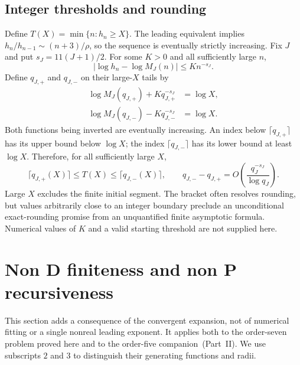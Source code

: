 \documentclass[11pt]{article}
\theoremstyle{remark}\newtheorem{remark}[theorem]{Remark}
\numberwithin{equation}{section}
\begin{document}
\subsection{Integer thresholds and rounding}
Define $T(X)=\min\{n:h_n\ge X\}$. The leading equivalent implies
$h_n/h_{n-1}\sim(n+3)/\rho$, so the sequence is eventually
strictly increasing. Fix $J$ and put $s_J=11(J+1)/2$.
For some $K>0$ and all sufficiently large $n$,
\[
|\log h_n-\log M_J(n)|\le K n^{-s_J}.
\]
Define $q_{J,+}$ and $q_{J,-}$ on their large-$X$ tails by
\begin{align*}
\log M_J(q_{J,+})+Kq_{J,+}^{-s_J}&=\log X,\\
\log M_J(q_{J,-})-Kq_{J,-}^{-s_J}&=\log X.
\end{align*}
Both functions being inverted are eventually increasing. An index
below $\lceil q_{J,+}\rceil$ has its upper bound below $\log X$;
the index $\lceil q_{J,-}\rceil$ has its lower bound at least
$\log X$. Therefore, for all sufficiently large $X$,
\begin{equation}\label{his:o7:rounding}
\lceil q_{J,+}(X)\rceil\le T(X)\le\lceil q_{J,-}(X)\rceil,
\qquad
q_{J,-}-q_{J,+}
=O\!\left(\frac{q_J^{-s_J}}{\log q_J}\right).
\end{equation}
Large $X$ excludes the finite initial segment. The bracket often
resolves rounding, but values arbitrarily close to an integer
boundary preclude an unconditional exact-rounding promise from
an unquantified finite asymptotic formula. Numerical values of
$K$ and a valid starting threshold are not supplied here.

\section{Non D finiteness and non P recursiveness}\label{his:o7:monodromy}
This section adds a consequence of the convergent expansion, not
of numerical fitting or a single nonreal leading exponent.
It applies both to the order-seven problem proved here and to the
order-five companion~(Part~II). We use subscripts $2$ and $3$
to distinguish their generating functions and radii.
\end{document}
